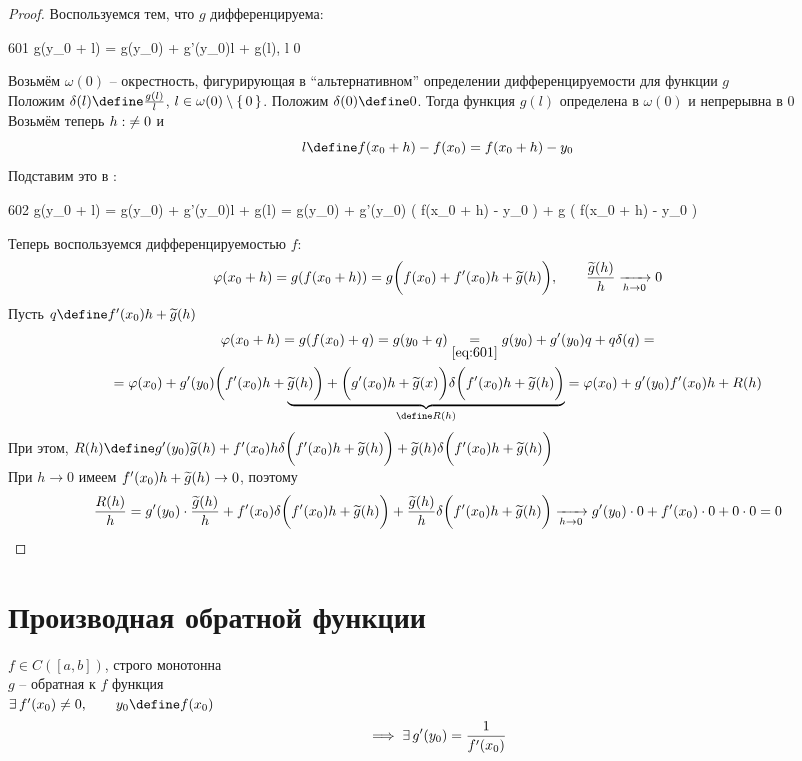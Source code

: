 \begin{proof}
	Воспользуемся тем, что $g$ дифференцируема:
	\begin{equ}{601}
		g(y_0 + l) = g(y_0) + g'(y_0)l + g(l), \qquad {}l  0
	\end{equ}
	Возьмём $\omega(0)$ -- окрестность, фигурирующая в ``альтернативном'' определении дифференцируемости для функции $g$ \\
	Положим $\delta(l) \define \frac{g(l)}l$, $l \in \omega(0) \setminus \set{0}$. Положим $\delta(0) \define 0$. Тогда функция $g(l)$ определена в $\omega(0)$ и непрерывна в $0$ \\
	Возьмём теперь $h \mathrel{:{\ne}} 0$ и
	$$ l \define f(x_0 + h) - f(x_0) = f(x_0 + h) - y_0 $$
	Подставим это в :
	\begin{equ}{602}
		g(y_0 + l) = g(y_0) + g'(y_0)l + g(l) = g(y_0) + g'(y_0) \bigg( f(x_0 + h) - y_0 \bigg) + g \bigg( f(x_0 + h) - y_0 \bigg)
	\end{equ}
	Теперь воспользуемся дифференцируемостью $f$:
	$$ \varphi(x_0 + h) = g(f(x_0 + h)) = g \bigg( f(x_0) + f'(x_0)h + \widetilde{g}(h) \bigg), \qquad \frac{\widetilde{g}(h)}h \xrightarrow[h \to 0]{} 0 $$
	Пусть $q \define f'(x_0)h + \vawe{g}(h)$
	\begin{multline*}
		\vphi(x_0 + h) = g(f(x_0) + q) = g(y_0 + q) \underset{\eref{601}}= g(y_0) + g'(y_0)q + q\delta(q) = \\ = \vphi(x_0) + g'(y_0) \bigg( f'(x_0)h + \underbrace{\vawe{g}(h) \bigg) + \bigg( g'(x_0)h + \vawe{g}(x) \bigg) \delta \bigg( f'(x_0)h + \vawe{g}(h) \bigg)}_{\define R(h)} = \vphi(x_0) + g'(y_0)f'(x_0)h + R(h)
	\end{multline*}
	При этом, $R(h) \define g'(y_0)\vawe{g}(h) + f'(x_0)h\delta \bigg( f'(x_0)h + \vawe{g}(h) \bigg) + \vawe{g}(h) \delta \bigg( f'(x_0)h + \vawe{g}(h) \bigg) $ \\
	При $h \to 0$ имеем $f'(x_0)h + \widetilde{g}(h) \to 0$, поэтому
	$$ \frac{R(h)}h = g'(y_0) \cdot \frac{\widetilde{g}(h)}h + f'(x_0) \delta \bigg( f'(x_0)h + \widetilde{g}(h) \bigg) + \frac{\widetilde{g}(h)}h \delta \bigg( f'(x_0)h + \widetilde{g}(h) \bigg) \xrightarrow[h \to 0]{} g'(y_0) \cdot 0 + f'(x_0) \cdot 0 + 0 \cdot 0 = 0 $$
\end{proof}

\section{Производная обратной функции}

\begin{property}
	$f \in C([a, b]) $, строго монотонна \\
	$g$ -- обратная к $f$ функция \\
	$\exist f'(x_0) \ne 0, \qquad y_0 \define f(x_0) $
	$$ \implies \exists\, g'(y_0) = \frac1{f'(x_0)} $$
\end{property}

